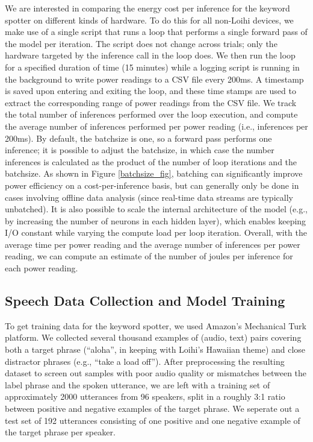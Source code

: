 \documentclass[sigconf, screen]{acmart}
\begin{document}
We are interested in comparing the energy cost per inference for the keyword spotter on different kinds of hardware. To do this for all non-Loihi devices, we make use of a single script that runs a loop that performs a single forward pass of the model per iteration. The script does not change across trials; only the hardware targeted by the inference call in the loop does. We then run the loop for a specified duration of time (15 minutes) while a logging script is running in the background to write power readings to a CSV file every 200ms. A timestamp is saved upon entering and exiting the loop, and these time stamps are used to extract the corresponding range of power readings from the CSV file. We track the total number of inferences performed over the loop execution, and compute the average number of inferences performed per power reading (i.e., inferences per 200ms). By default, the batchsize is one, so a forward pass performs one inference; it is possible to adjust the batchsize, in which case the number inferences is calculated as the product of the number of loop iterations and the batchsize. As shown in Figure \ref{batchsize_fig}, batching can significantly improve power efficiency on a cost-per-inference basis, but can generally only be done in cases involving offline data analysis (since real-time data streams are typically unbatched). It is also possible to scale the internal architecture of the model (e.g., by increasing the number of neurons in each hidden layer), which enables keeping I/O constant while varying the compute load per loop iteration. Overall, with the average time per power reading and the average number of inferences per power reading, we can compute an estimate of the number of joules per inference for each power reading.

\subsection{Speech Data Collection and Model Training}

To get training data for the keyword spotter, we used Amazon's Mechanical Turk platform. We collected several thousand examples of (audio, text) pairs covering both a target phrase (``aloha'', in keeping with Loihi's Hawaiian theme) and close distractor phrases (e.g., ``take a load off''). After preprocessing the resulting dataset to screen out samples with poor audio quality or mismatches between the label phrase and the spoken utterance, we are left with a training set of approximately 2000 utterances from 96 speakers, split in a roughly 3:1 ratio between positive and negative examples of the target phrase. We seperate out a test set of 192 utterances consisting of one positive and one negative example of the target phrase per speaker. 
 
\end{document}
